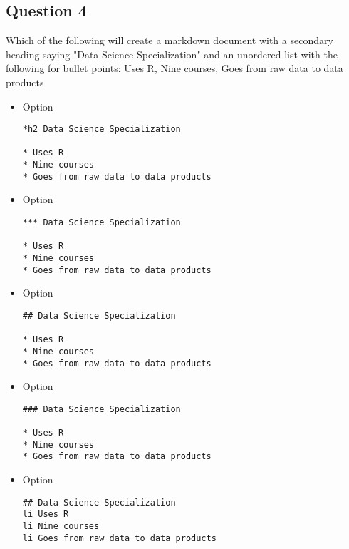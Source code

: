 \subsection*{Question 4}
Which of the following will create a markdown document with a secondary heading saying "Data Science Specialization" and an unordered list with the following for bullet points: Uses R, Nine courses, Goes from raw data to data products
\begin{itemize}
\item Option
\begin{framed}
\begin{verbatim}
*h2 Data Science Specialization 

* Uses R 
* Nine courses 
* Goes from raw data to data products
\end{verbatim}
\end{framed}
\item Option
\begin{framed}
\begin{verbatim}
*** Data Science Specialization 

* Uses R 
* Nine courses 
* Goes from raw data to data products
\end{verbatim}
\end{framed}
\item Option
\begin{framed}
\begin{verbatim}
## Data Science Specialization 

* Uses R 
* Nine courses 
* Goes from raw data to data products
\end{verbatim}
\end{framed}
\item Option
\begin{framed}
\begin{verbatim}
### Data Science Specialization 

* Uses R 
* Nine courses 
* Goes from raw data to data products
\end{verbatim}
\end{framed}

\item Option
\begin{framed}
\begin{verbatim}
## Data Science Specialization 
li Uses R 
li Nine courses 
li Goes from raw data to data products
\end{verbatim}
\end{framed}


\end{itemize}
